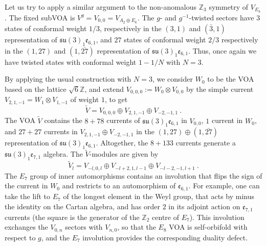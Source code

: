 \documentclass[11pt,reqno]{article}
\newcommand{\be}{\begin{equation}}
\newcommand{\ee}{\end{equation}}
\newcommand{\ZZ}{\mathbb{Z}}
\newcommand{\alg}[1]{\mathfrak{#1}}
\begin{document}
Let us try to apply a similar argument to the non-anomalous $\ZZ_3$ symmetry of $V_{E_8}$. The fixed subVOA is $V^g=V_{0,0}=V_{A_2\oplus E_6}$. The $g$- and $g^{-1}$-twisted sectors have $3$ states of conformal weight $1/3$, respectively in the $(3,1)$ and $(\bar 3,1)$ representation of $\alg{su}(3)_1\alg{e}_{6,1}$, and $27$ states of conformal weight $2/3$ respectively in the $(1,27)$ and $(1,\bar{27})$ representation of  $\alg{su}(3)_1\alg{e}_{6,1}$. Thus, once again we have twisted states with conformal weight $1-1/N$ with $N=3$.

By applying the usual construction with $N=3$, we consider $W_0$ to be the VOA based on the lattice $\sqrt{6}\ZZ$, and extend $V_{0,0,0}:=W_0\otimes V_{0,0}$ by the simple current $V_{2,1,-1}=W_1\otimes V_{1,-1}$ of weight $1$, to get
\be \tilde V=V_{0,0,0}\oplus V_{2,1,-1}\oplus V_{-2,-1,1}\ .
\ee The VOA $\tilde V$ contains the $8+78$ currents of $\alg{su}(3)_1\alg{e}_{6,1}$ in $V_{0,0}$, $1$ current in $W_0$, and $27+27$ currents in  $V_{2,1,-1}\oplus V_{-2,-1,1}$ in the $(1,27)\oplus (1,\bar{27})$ representation of $\alg{su}(3)_1\alg{e}_{6,1}$. Altogether, the $8+133$ currents generate a $\alg{su}(3)_1\alg{e}_{7,1}$ algebra. The $\tilde V$-modules are given by
\be \tilde V_l=V_{-l,0,l}\oplus V_{-l+2,1,l-1}\oplus V_{-l-2,-1,l+1}\ .
\ee
 The $E_7$ group of inner automorphisms contains an involution that flips the sign of the current in $W_0$ and restricts to an automorphism of $\alg{e}_{6,1}$. For example, one can take the lift to $E_7$ of the longest element in the Weyl group, that acts by minus the identity on the Cartan algebra, and has order $2$ in its adjoint action on $\alg{e}_{7,1}$ currents (the square is the generator of the $\ZZ_2$ centre of $E_7$). This involution exchanges the $V_{0,n}$ sectors with $V_{n,0}$, so that the $E_8$ VOA is self-orbifold with respect to $g$, and the $E_7$ involution provides the corresponding duality defect.
\end{document}
